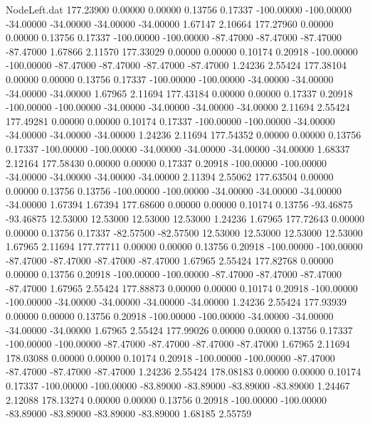 \begin{filecontents}{NodeLeft.dat}
 177.23900    0.00000    0.00000     0.13756    0.17337 -100.00000 -100.00000  -34.00000  -34.00000  -34.00000  -34.00000    1.67147    2.10664
 177.27960    0.00000    0.00000     0.13756    0.17337 -100.00000 -100.00000  -87.47000  -87.47000  -87.47000  -87.47000    1.67866    2.11570
 177.33029    0.00000    0.00000     0.10174    0.20918 -100.00000 -100.00000  -87.47000  -87.47000  -87.47000  -87.47000    1.24236    2.55424
 177.38104    0.00000    0.00000     0.13756    0.17337 -100.00000 -100.00000  -34.00000  -34.00000  -34.00000  -34.00000    1.67965    2.11694
 177.43184    0.00000    0.00000     0.17337    0.20918 -100.00000 -100.00000  -34.00000  -34.00000  -34.00000  -34.00000    2.11694    2.55424
 177.49281    0.00000    0.00000     0.10174    0.17337 -100.00000 -100.00000  -34.00000  -34.00000  -34.00000  -34.00000    1.24236    2.11694
 177.54352    0.00000    0.00000     0.13756    0.17337 -100.00000 -100.00000  -34.00000  -34.00000  -34.00000  -34.00000    1.68337    2.12164
 177.58430    0.00000    0.00000     0.17337    0.20918 -100.00000 -100.00000  -34.00000  -34.00000  -34.00000  -34.00000    2.11394    2.55062
 177.63504    0.00000    0.00000     0.13756    0.13756 -100.00000 -100.00000  -34.00000  -34.00000  -34.00000  -34.00000    1.67394    1.67394
 177.68600    0.00000    0.00000     0.10174    0.13756  -93.46875  -93.46875   12.53000   12.53000   12.53000   12.53000    1.24236    1.67965
 177.72643    0.00000    0.00000     0.13756    0.17337  -82.57500  -82.57500   12.53000   12.53000   12.53000   12.53000    1.67965    2.11694
 177.77711    0.00000    0.00000     0.13756    0.20918 -100.00000 -100.00000  -87.47000  -87.47000  -87.47000  -87.47000    1.67965    2.55424
 177.82768    0.00000    0.00000     0.13756    0.20918 -100.00000 -100.00000  -87.47000  -87.47000  -87.47000  -87.47000    1.67965    2.55424
 177.88873    0.00000    0.00000     0.10174    0.20918 -100.00000 -100.00000  -34.00000  -34.00000  -34.00000  -34.00000    1.24236    2.55424
 177.93939    0.00000    0.00000     0.13756    0.20918 -100.00000 -100.00000  -34.00000  -34.00000  -34.00000  -34.00000    1.67965    2.55424
 177.99026    0.00000    0.00000     0.13756    0.17337 -100.00000 -100.00000  -87.47000  -87.47000  -87.47000  -87.47000    1.67965    2.11694
 178.03088    0.00000    0.00000     0.10174    0.20918 -100.00000 -100.00000  -87.47000  -87.47000  -87.47000  -87.47000    1.24236    2.55424
 178.08183    0.00000    0.00000     0.10174    0.17337 -100.00000 -100.00000  -83.89000  -83.89000  -83.89000  -83.89000    1.24467    2.12088
 178.13274    0.00000    0.00000     0.13756    0.20918 -100.00000 -100.00000  -83.89000  -83.89000  -83.89000  -83.89000    1.68185    2.55759

\end{filecontents}
